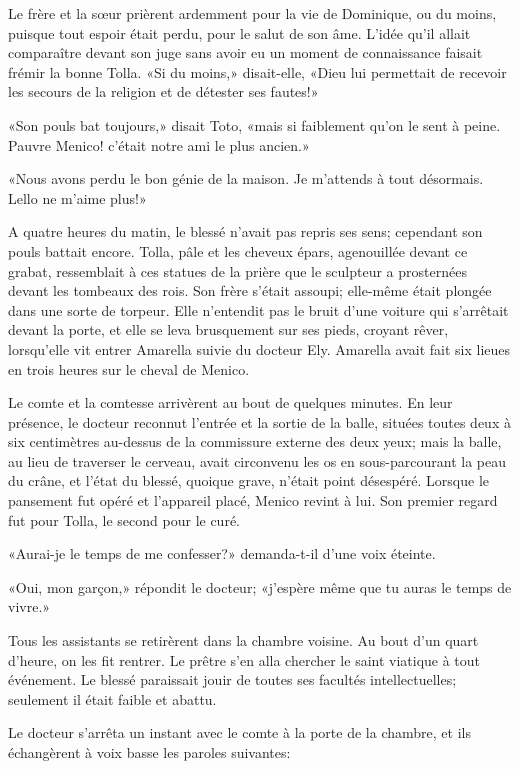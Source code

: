 Le frère et la sœur prièrent ardemment pour la vie de Dominique, ou du
moins, puisque tout espoir était perdu, pour le salut de son âme. L'idée
qu'il allait comparaître devant son juge sans avoir eu un moment de
connaissance faisait frémir la bonne Tolla. «Si du moins,» disait-elle,
«Dieu lui permettait de recevoir les secours de la religion et de
détester ses fautes!»

«Son pouls bat toujours,» disait Toto, «mais si faiblement qu'on le sent
à peine. Pauvre Menico! c'était notre ami le plus ancien.»

«Nous avons perdu le bon génie de la maison. Je m'attends à tout
désormais. Lello ne m'aime plus!»

A quatre heures du matin, le blessé n'avait pas repris ses sens;
cependant son pouls battait encore. Tolla, pâle et les cheveux épars,
agenouillée devant ce grabat, ressemblait à ces statues de la prière que
le sculpteur a prosternées devant les tombeaux des rois. Son frère
s'était assoupi; elle-même était plongée dans une sorte de torpeur. Elle
n'entendit pas le bruit d'une voiture qui s'arrêtait devant la porte, et
elle se leva brusquement sur ses pieds, croyant rêver, lorsqu'elle vit
entrer Amarella suivie du docteur Ely. Amarella avait fait six lieues en
trois heures sur le cheval de Menico.

Le comte et la comtesse arrivèrent au bout de quelques minutes. En leur
présence, le docteur reconnut l'entrée et la sortie de la balle, situées
toutes deux à six centimètres au-dessus de la commissure externe des
deux yeux; mais la balle, au lieu de traverser le cerveau, avait
circonvenu les os en sous-parcourant la peau du crâne, et l'état du
blessé, quoique grave, n'était point désespéré. Lorsque le pansement fut
opéré et l'appareil placé, Menico revint à lui. Son premier regard fut
pour Tolla, le second pour le curé.

«Aurai-je le temps de me confesser?» demanda-t-il d'une voix éteinte.

«Oui, mon garçon,» répondit le docteur; «j'espère même que tu auras le
temps de vivre.»

Tous les assistants se retirèrent dans la chambre voisine. Au bout d'un
quart d'heure, on les fit rentrer. Le prêtre s'en alla chercher le saint
viatique à tout événement. Le blessé paraissait jouir de toutes ses
facultés intellectuelles; seulement il était faible et abattu.

Le docteur s'arrêta un instant avec le comte à la porte de la chambre,
et ils échangèrent à voix basse les paroles suivantes:


